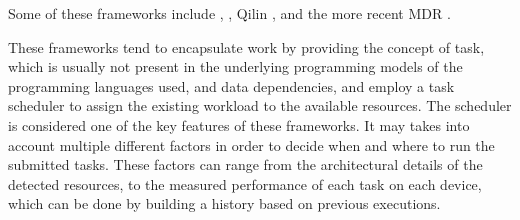 \documentclass[main.tex]{subfiles}
\begin{document}
Some of these frameworks include \gama {}, \starpu {}, Qilin , and the more recent MDR .

These frameworks tend to encapsulate work by providing the concept of task, which is usually not present in the underlying programming models of the programming languages used, and data dependencies, and employ a task scheduler to assign the existing workload to the available resources.
The scheduler is considered one of the key features of these frameworks. It may takes into account multiple different factors in order to decide when and where to run the submitted tasks. These factors can range from the architectural details of the detected resources, to the measured performance of each task on each device, which can be done by building a history based on previous executions.



\end{document}

